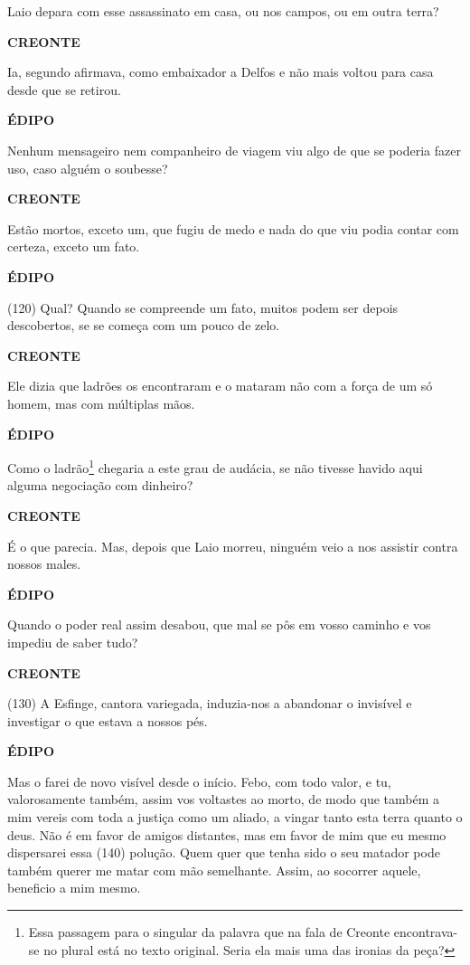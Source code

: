 Laio depara com esse assassinato em casa, ou nos campos, ou em outra
terra?

\textbf{CREONTE }

Ia, segundo afirmava, como embaixador a Delfos e não mais voltou para
casa desde que se retirou.

\textbf{ÉDIPO}

Nenhum mensageiro nem companheiro de viagem viu algo de que se poderia
fazer uso, caso alguém o soubesse?

\textbf{CREONTE }

Estão mortos, exceto um, que fugiu de medo e nada do que viu podia
contar com certeza, exceto um fato.

\textbf{ÉDIPO}

(120) Qual? Quando se compreende um fato, muitos podem ser depois
descobertos, se se começa com um pouco de zelo.

\textbf{CREONTE }

Ele dizia que ladrões os encontraram e o mataram não com a força de um
só homem, mas com múltiplas mãos.

\textbf{ÉDIPO}

Como o ladrão\footnote{Essa passagem para o singular da palavra que na
  fala de Creonte encontrava-se no plural está no texto original. Seria
  ela mais uma das ironias da peça?} chegaria a este grau de audácia, se
não tivesse havido aqui alguma negociação com dinheiro?

\textbf{CREONTE }

É o que parecia. Mas, depois que Laio morreu, ninguém veio a nos
assistir contra nossos males.

\textbf{ÉDIPO}

Quando o poder real assim desabou, que mal se pôs em vosso caminho e vos
impediu de saber tudo?

\textbf{CREONTE }

(130) A Esfinge, cantora variegada, induzia-nos a abandonar o invisível
e investigar o que estava a nossos pés.

\textbf{ÉDIPO}

Mas o farei de novo visível desde o início. Febo, com todo valor, e tu,
valorosamente também, assim vos voltastes ao morto, de modo que também a
mim vereis com toda a justiça como um aliado, a vingar tanto esta terra
quanto o deus. Não é em favor de amigos distantes, mas em favor de mim
que eu mesmo dispersarei essa (140) polução. Quem quer que tenha sido o
seu matador pode também querer me matar com mão semelhante. Assim, ao
socorrer aquele, beneficio a mim mesmo.

